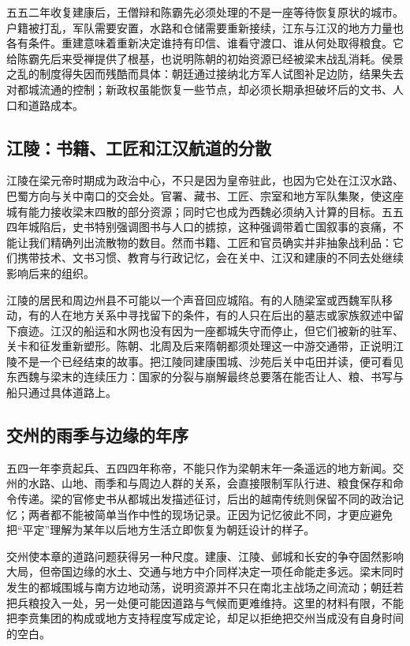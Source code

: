 五五二年收复建康后，王僧辩和陈霸先必须处理的不是一座等待恢复原状的城市。户籍被打乱，军队需要安置，水路和仓储需要重新接续，江东与江汉的地方力量也各有条件。重建意味着重新决定谁持有印信、谁看守渡口、谁从何处取得粮食。它给陈霸先后来受禅提供了根基，也说明陈朝的初始资源已经被梁末战乱消耗。侯景之乱的制度得失因而残酷而具体：朝廷通过接纳北方军人试图补足边防，结果失去对都城流通的控制；新政权虽能恢复一些节点，却必须长期承担破坏后的文书、人口和道路成本。

\subsection{江陵：书籍、工匠和江汉航道的分散}

江陵在梁元帝时期成为政治中心，不只是因为皇帝驻此，也因为它处在江汉水路、巴蜀方向与关中南口的交会处。官署、藏书、工匠、宗室和地方军队集聚，使这座城有能力接收梁末四散的部分资源；同时它也成为西魏必须纳入计算的目标。五五四年城陷后，史书特别强调图书与人口的掳掠，这种强调带着亡国叙事的哀痛，不能让我们精确列出流散物的数目。然而书籍、工匠和官员确实并非抽象战利品：它们携带技术、文书习惯、教育与行政记忆，会在关中、江汉和建康的不同去处继续影响后来的组织。

江陵的居民和周边州县不可能以一个声音回应城陷。有的人随梁室或西魏军队移动，有的人在地方关系中寻找留下的条件，有的人只在后出的墓志或家族叙述中留下痕迹。江汉的船运和水网也没有因为一座都城失守而停止，但它们被新的驻军、关卡和征发重新塑形。陈朝、北周及后来隋朝都须处理这一中游交通带，正说明江陵不是一个已经结束的故事。把江陵同建康围城、沙苑后关中屯田并读，便可看见东西魏与梁末的连续压力：国家的分裂与崩解最终总要落在能否让人、粮、书写与船只通过具体道路上。

\subsection{交州的雨季与边缘的年序}

五四一年李贲起兵、五四四年称帝，不能只作为梁朝末年一条遥远的地方新闻。交州的水路、山地、雨季和与周边人群的关系，会直接限制军队行进、粮食保存和命令传递。梁的官修史书从都城出发描述征讨，后出的越南传统则保留不同的政治记忆；两者都不能被简单当作中性的现场记录。正因为记忆彼此不同，才更应避免把“平定”理解为某年以后地方生活立即恢复为朝廷设计的样子。

交州使本章的道路问题获得另一种尺度。建康、江陵、邺城和长安的争夺固然影响大局，但帝国边缘的水土、交通与地方中介同样决定一项任命能走多远。梁末同时发生的都城围城与南方边地动荡，说明资源并不只在南北主战场之间流动；朝廷若把兵粮投入一处，另一处便可能因道路与气候而更难维持。这里的材料有限，不能把李贲集团的构成或地方支持程度写成定论，却足以拒绝把交州当成没有自身时间的空白。

